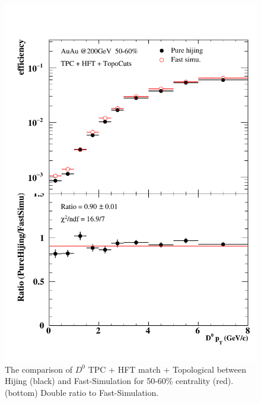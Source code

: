 \begin{figure}[htbp]
\begin{minipage}[htbp]{0.47\linewidth}
\centering
\includegraphics[width=1.0\textwidth,angle=0]{figure/Run14_D0HFT/50_60_2.pdf}
\caption{ The comparison of $D^0$ TPC + HFT match + Topological between Hijing (black) and Fast-Simulation for 50-60\% centrality (red). (bottom) Double ratio to Fast-Simulation.\label{50_60}}
\end{minipage}
\hfill
\begin{minipage}[htbp]{0.47\linewidth}
\centering

\end{minipage}
\end{figure}
